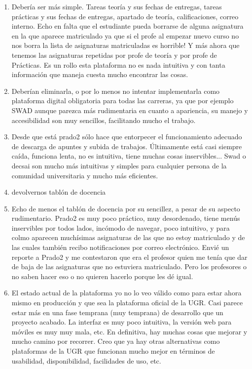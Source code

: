 \begin{enumerate}
\item Debería ser más simple. Tareas teoría y sus fechas de entregas, tareas prácticas y sus fechas de entregas, apartado de teoría, calificaciones, correo interno. Echo en falta que el estudiante pueda borrarse de alguna asignatura en la que aparece matriculado ya que si el profe al empezar nuevo curso no nos borra la lista de asignaturas matriculadas es horrible! Y más ahora que tenemos las asignaturas repetidas por profe de teoría y por profe de Prácticas. Es un rollo esta plataforma no es nada intuitiva y con tanta información que maneja cuesta mucho encontrar las cosas.
\item Deberían eliminarla, o por lo menos no intentar implementarla como plataforma digital obligatoria para todas las carreras, ya que por ejemplo SWAD aunque parezca más rudimentaria en cuanto a apariencia, su manejo y accesibilidad son muy sencillos, facilitando mucho el trabajo.
\item Desde que está prado2 sólo hace que entorpecer el funcionamiento adecuado de descarga de apuntes y subida de trabajos. Últimamente está casi siempre caída, funciona lenta, no es intuitiva, tiene muchas cosas inservibles... Swad o decsai son mucho más intuitivas y simples para cualquier persona de la comunidad universitaria y mucho más eficientes.
\item devolvernos tablón de docencia
\item Echo de menos el tablón de docencia por su sencillez, a pesar de su aspecto rudimentario. Prado2 es muy poco práctico, muy desordenado, tiene menús inservibles por todos lados, incómodo de navegar, poco intuitivo, y para colmo aparecen muchísimas asignaturas de las que no estoy matriculado y de las cuales también recibo notificaciones por correo electrónico. Envié un reporte a Prado2 y me contestaron que era el profesor quien me tenía que dar de baja de las asignaturas que no estuviera matriculado. Pero los profesores o no saben hacer eso o no quieren hacerlo porque les dé igual. 
\item El estado actual de la plataforma yo no lo veo válido como para estar ahora mismo en producción y que sea la plataforma oficial de la UGR. Casi parece estar más en una fase temprana (muy temprana) de desarrollo que un proyecto acabado. La interfaz es muy poco intuitiva, la versión web para móviles es muy muy mala, etc. En definitiva, hay muchas cosas que mejorar y mucho camino por recorrer. Creo que ya hay otras alternativas como plataformas de la UGR que funcionan mucho mejor en términos de usabilidad, disponibilidad, facilidades de uso, etc.

\end{enumerate}
